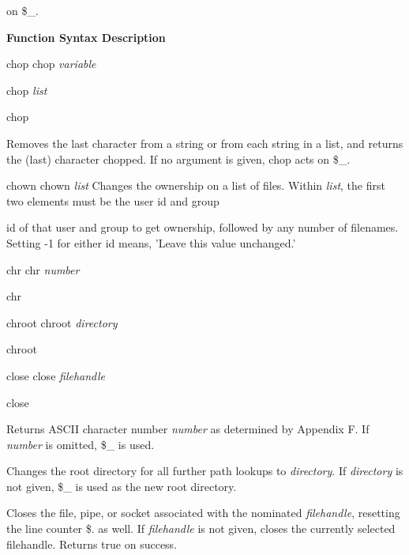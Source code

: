 \documentclass[a4paper,11pt]{book}
\begin{document}
\noindent on \$\_.

\noindent 

\noindent 

\noindent \textbf{Function Syntax Description}

\noindent 

\noindent chop chop \textit{variable}

\noindent 

\noindent chop \textit{list}

\noindent 

\noindent chop

\noindent 

\noindent Removes the last character from a string or from each string in a list, and returns the (last) character chopped. If no argument is given, chop acts on \$\_.

\noindent 

\noindent chown chown \textit{list }Changes the ownership on a list of files. Within \textit{list}, the first two elements must be the user id and group

\noindent id of that user and group to get ownership, followed by any number of filenames. Setting -1 for either id means, 'Leave this value unchanged.'

\noindent 

\noindent chr chr \textit{number}

\noindent 

\noindent chr

\noindent 

\noindent chroot chroot \textit{directory}

\noindent 

\noindent chroot

\noindent 

\noindent close close \textit{filehandle}

\noindent 

\noindent close

\noindent 

\noindent Returns ASCII character number \textit{number }as determined by Appendix F. If \textit{number }is omitted, \$\_ is used.

\noindent 

\noindent Changes the root directory for all further path lookups to \textit{directory}. If \textit{directory }is not given, \$\_ is used as the new root directory.

\noindent 

\noindent Closes the file, pipe, or socket associated with the nominated \textit{filehandle}, resetting the line counter \$. as well. If \textit{filehandle }is not given, closes the currently selected filehandle. Returns true on success.
\end{document}
